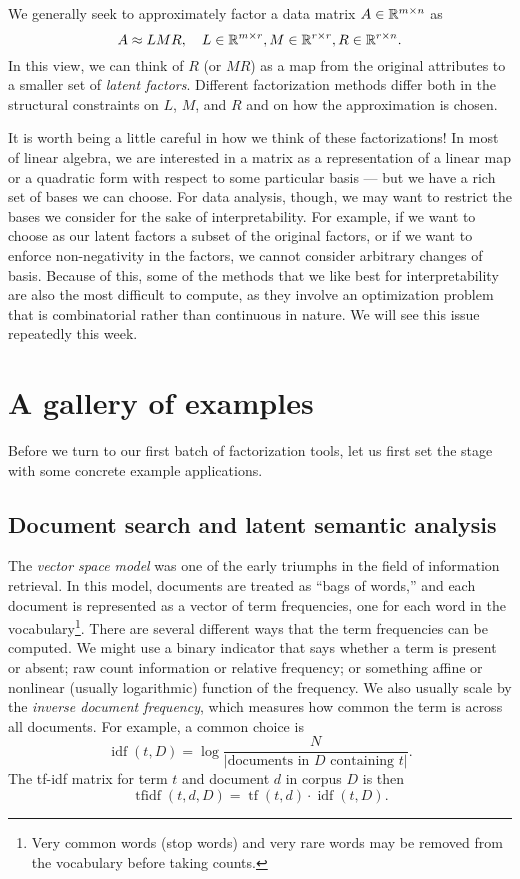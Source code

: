 \documentclass[12pt, leqno]{article} %
\begin{document}
We generally seek to approximately factor a data matrix
$A \in \mathbb{R}^{m \times n}$ as
\[
  A \approx LMR, \quad
  L \in \mathbb{R}^{m \times r},
  M \in \mathbb{R}^{r \times r},
  R \in \mathbb{R}^{r \times n}.
\]
In this view, we can think of $R$ (or $MR$) as a map from the original
attributes to a smaller set of {\em latent factors}.  Different
factorization methods differ both in the structural constraints on
$L$, $M$, and $R$ and on how the approximation is chosen.

It is worth being a little careful in how we think of these
factorizations!  In most of linear algebra, we are interested in a
matrix as a representation of a linear map or a quadratic form with
respect to some particular basis --- but we have a rich set of bases we
can choose.  For data analysis, though, we may want to restrict the
bases we consider for the sake of interpretability.  For example, if
we want to choose as our latent factors a subset of the original
factors, or if we want to enforce non-negativity in the factors, we
cannot consider arbitrary changes of basis.  Because of this, some of
the methods that we like best for interpretability are also the most
difficult to compute, as they involve an optimization problem that is
combinatorial rather than continuous in nature.  We will see this
issue repeatedly this week.

\section{A gallery of examples}

Before we turn to our first batch of factorization tools, let us first
set the stage with some concrete example applications.

\subsection{Document search and latent semantic analysis}

The {\em vector space model} was one of the early triumphs
in the field of information retrieval.  In this model,
documents are treated as ``bags of words,'' and each document
is represented as a vector of term frequencies, one for each
word in the vocabulary\footnote{%
  Very common words (stop words) and very rare words may be removed
  from the vocabulary before taking counts.
}.
There are several different ways that the term frequencies can be
computed.  We might use a binary indicator that says whether a term is
present or absent; raw count information or relative frequency; or
something affine or nonlinear (usually logarithmic) function of the
frequency.  We also usually scale by the
{\em inverse document frequency}, which measures how common the
term is across all documents. For example, a common choice is
\[
  \operatorname{idf}(t,D) = \log \frac{N}{|\mbox{documents in $D$ containing $t$}|}.
\]
The tf-idf matrix for term $t$ and document $d$ in corpus $D$ is then
\[
  \operatorname{tfidf}(t,d,D) =
  \operatorname{tf}(t,d) \cdot
  \operatorname{idf}(t,D).
\]
\end{document}
